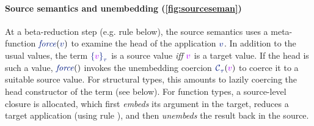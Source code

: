 \paragraph{\bf Source semantics and unembedding (\autoref{fig:sourceseman})}
At a beta-reduction step (e.g. rule {} below), the source
semantics uses a meta-function
$\sforce{\source{v}}$ to examine the head of the application $\svar{v}$.
In addition to the usual values, the term
$\salien{\tval}{\stau}{\relax}$ is a source value \emph{iff}
$\tval$ is a target value. If the head is such a
value, $\sforce{}$ invokes the unembedding coercion
$\scoerce\stau\relax\tval$ to coerce it to a suitable source
value. For structural types, this amounts to lazily coercing the head
constructor of the term (see below). For function types, a source-level closure is
allocated, which first \emph{embeds} its argument in the target,
reduces a target application (using rule {}), and
then \emph{unembeds} the result back in the source.
%
%
%
%
%
%
